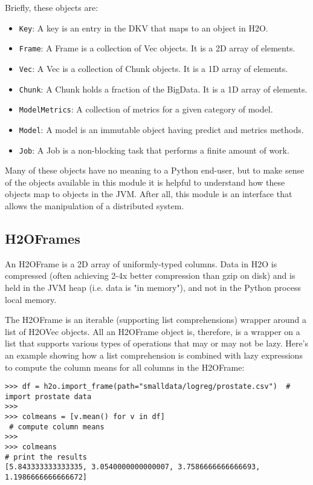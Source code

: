 Briefly, these objects are:

\begin{itemize}
\item \texttt{Key}: A key is an entry in the DKV that maps to an object in H2O.
\item \texttt{Frame}: A Frame is a collection of Vec objects. It is a 2D array of elements.
\item \texttt{Vec}: A Vec is a collection of Chunk objects. It is a 1D array of elements.
\item \texttt{Chunk}: A Chunk holds a fraction of the BigData. It is a 1D array of elements.
\item \texttt{ModelMetrics}: A collection of metrics for a given category of model.
\item \texttt{Model}: A model is an immutable object having predict and metrics methods.
\item \texttt{Job}: A Job is a non-blocking task that performs a finite amount of work.
\end{itemize}
Many of these objects have no meaning to a Python end-user, but to make sense of the objects available in this module it is helpful to understand how these objects map to objects in the JVM. After all, this module is an interface that allows the manipulation of a distributed system.


\subsection{H2OFrames}

An H2OFrame is a 2D array of uniformly-typed columns. Data in H2O is compressed (often achieving 2-4x better compression than gzip on disk) and is held in the JVM heap (i.e. data is "in memory"), and not in the Python process local memory. 

The H2OFrame is an iterable (supporting list comprehensions) wrapper around a list of H2OVec objects. All an H2OFrame object is, therefore, is a wrapper on a list that supports various types of operations that may or may not be lazy. Here's an example showing how a list comprehension is combined with lazy expressions to compute the column means for all columns in the H2OFrame:

\begin{lstlisting}[style=python]
>>> df = h2o.import_frame(path="smalldata/logreg/prostate.csv")  # import prostate data
>>>
>>> colmeans = [v.mean() for v in df]                           
 # compute column means
>>>
>>> colmeans                                                     
# print the results
[5.843333333333335, 3.0540000000000007, 3.7586666666666693, 1.1986666666666672]
\end{lstlisting}

